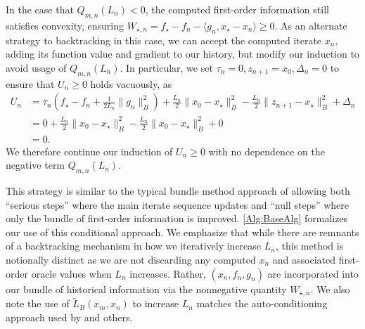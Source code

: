 \documentclass[11pt]{article}
\numberwithin{equation}{section}
\newcommand{\idxArgmin}{m}
\newcommand{\normB}[1]{\|{#1}\|_B}
\theoremstyle{definition}
\theoremstyle{plain}
\theoremstyle{definition}
\begin{document}
In the case that $Q_{\idxArgmin,n}(L_n) < 0$, the computed first-order information still satisfies convexity, ensuring $W_{\star,n} = f_\star - f_n - \langle g_n, x_\star - x_n \rangle \geq 0$. As an alternate strategy to backtracking in this case, we can accept the computed iterate $x_n$, adding its function value and gradient to our history, but modify our induction to avoid usage of $Q_{\idxArgmin,n}(L_n)$. In particular, we set $\tau_n = 0, z_{n+1} = x_0, \Delta_n = 0$ to ensure that $U_n \geq 0$ holds vacuously, as
\begin{align*}
    U_n & = \tau_n\left(f_\star - f_n + \frac{1}{2L_n}\normB{g_n}^2\right) + \frac{L_n}{2}\normB{x_0-x_\star}^2-\frac{L_n}{2}\normB{z_{n+1}-x_\star}^2 + \Delta_n \\
    & = 0 + \frac{L_n}{2}\normB{x_0-x_\star}^2-\frac{L_n}{2}\normB{x_0-x_\star}^2 + 0 \\
    & = 0.
\end{align*}
We therefore continue our induction of $U_n \geq 0$ with no dependence on the negative term $Q_{m,n}(L_n)$.

This strategy is similar to the typical bundle method approach of allowing both ``serious steps'' where the main iterate sequence updates and ``null steps'' where only the bundle of first-order information is improved.
\cref{Alg:BaseAlg} formalizes our use of this conditional approach. We emphasize that while there are remnants of a backtracking mechanism in how we iteratively increase $L_n$, this method is notionally distinct as we are not discarding any computed $x_n$ and associated first-order oracle values when $L_n$ increases. Rather, $(x_n, f_n, g_n)$ are incorporated into our bundle of historical information via the nonnegative quantity $W_{\star,n}$. We also note the use of $\tilde{L}_B(x_m, x_n)$ to increase $L_n$ matches the auto-conditioning approach used by \cite{AdGD_Malitsky,ACFGM_Li,AdaNAG_Suh} and others.
\end{document}
